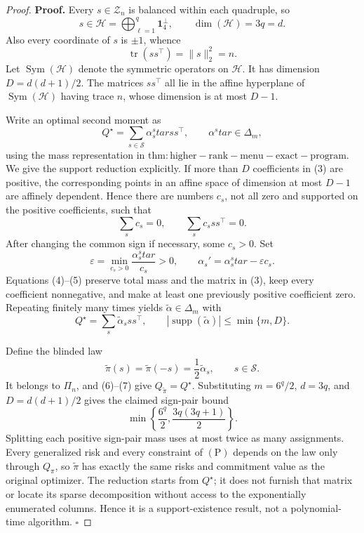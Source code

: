 \documentclass{article}
\begin{document}
\begin{proof}
\textbf{Proof.}
Every \(s\in\mathcal Z_n\) is balanced within each quadruple, so
\[
s\in\mathcal H
=\bigoplus_{\ell=1}^q\mathbf1_4^\perp,
\qquad \dim(\mathcal H)=3q=d. \tag{1}
\]
Also every coordinate of \(s\) is \(\pm1\), whence
\[
\operatorname{tr}(ss^\top)=\|s\|_2^2=n. \tag{2}
\]
Let \(\operatorname{Sym}(\mathcal H)\) denote the symmetric operators on \(\mathcal H\).  It has dimension
\(D=d(d+1)/2\).  The matrices \(ss^\top\) all lie in the affine hyperplane of \(\operatorname{Sym}(\mathcal H)\) having trace \(n\), whose dimension is at most \(D-1\).

Write an optimal second moment as
\[
Q^\star=\sum_{s\in\mathscr S}\alpha_s^star ss^\top,
\qquad \alpha^star\in\Delta_m, \tag{3}
\]
using the mass representation in \(\mathrm{thm:higher-rank-menu-exact-program}\).  We give the support reduction explicitly.  If more than \(D\) coefficients in (3) are positive, the corresponding points in an affine space of dimension at most \(D-1\) are affinely dependent.  Hence there are numbers \(c_s\), not all zero and supported on the positive coefficients, such that
\[
\sum_sc_s=0,
\qquad
\sum_sc_sss^\top=0. \tag{4}
\]
After changing the common sign if necessary, some \(c_s>0\).  Set
\[
\varepsilon=\min_{c_s>0}\frac{\alpha_s^star}{c_s}>0,
\qquad
\alpha_s'=\alpha_s^star-\varepsilon c_s. \tag{5}
\]
Equations (4)--(5) preserve total mass and the matrix in (3), keep every coefficient nonnegative, and make at least one previously positive coefficient zero.  Repeating finitely many times yields \(\widetilde\alpha\in\Delta_m\) with
\[
Q^\star=\sum_s\widetilde\alpha_sss^\top,
\qquad
|\operatorname{supp}(\widetilde\alpha)|\le\min\{m,D\}. \tag{6}
\]

Define the blinded law
\[
\widetilde\pi(s)=\widetilde\pi(-s)=\frac12\widetilde\alpha_s,
\qquad s\in\mathscr S. \tag{7}
\]
It belongs to \(\Pi_n\), and (6)--(7) give \(Q_{\widetilde\pi}=Q^\star\).  Substituting \(m=6^q/2\), \(d=3q\), and \(D=d(d+1)/2\) gives the claimed sign-pair bound
\[
\min\left\{\frac{6^q}{2},\frac{3q(3q+1)}2\right\}. \tag{8}
\]
Splitting each positive sign-pair mass uses at most twice as many assignments.  Every generalized risk and every constraint of \((\mathrm P)\) depends on the law only through \(Q_\pi\), so \(\widetilde\pi\) has exactly the same risks and commitment value as the original optimizer.  The reduction starts from \(Q^\star\); it does not furnish that matrix or locate its sparse decomposition without access to the exponentially enumerated columns.  Hence it is a support-existence result, not a polynomial-time algorithm. \(\square\)
\end{proof}
\end{document}
